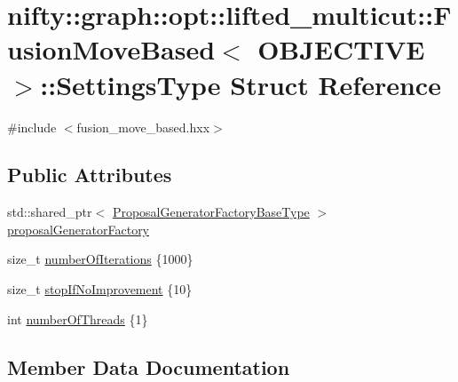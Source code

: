 \hypertarget{structnifty_1_1graph_1_1opt_1_1lifted__multicut_1_1FusionMoveBased_1_1SettingsType}{}\section{nifty\+:\+:graph\+:\+:opt\+:\+:lifted\+\_\+multicut\+:\+:Fusion\+Move\+Based$<$ O\+B\+J\+E\+C\+T\+I\+VE $>$\+:\+:Settings\+Type Struct Reference}
\label{structnifty_1_1graph_1_1opt_1_1lifted__multicut_1_1FusionMoveBased_1_1SettingsType}


{\ttfamily \#include $<$fusion\+\_\+move\+\_\+based.\+hxx$>$}

\subsection*{Public Attributes}
\begin{DoxyCompactItemize}
\item 
std\+::shared\+\_\+ptr$<$ \hyperlink{classnifty_1_1graph_1_1opt_1_1lifted__multicut_1_1FusionMoveBased_ad32ffc33c2cf2b316bcc7231b9fba245}{Proposal\+Generator\+Factory\+Base\+Type} $>$ \hyperlink{structnifty_1_1graph_1_1opt_1_1lifted__multicut_1_1FusionMoveBased_1_1SettingsType_a38c176f14f90050494f1012f777fac56}{proposal\+Generator\+Factory}
\item 
size\+\_\+t \hyperlink{structnifty_1_1graph_1_1opt_1_1lifted__multicut_1_1FusionMoveBased_1_1SettingsType_a83b8f8373c0d5320d17ac2292f4cb01d}{number\+Of\+Iterations} \{1000\}
\item 
size\+\_\+t \hyperlink{structnifty_1_1graph_1_1opt_1_1lifted__multicut_1_1FusionMoveBased_1_1SettingsType_ae90d5be70f54fba771ebcbdf0216d2e9}{stop\+If\+No\+Improvement} \{10\}
\item 
int \hyperlink{structnifty_1_1graph_1_1opt_1_1lifted__multicut_1_1FusionMoveBased_1_1SettingsType_a8362e59436e0f9c2cf47ee3d70ebe681}{number\+Of\+Threads} \{1\}
\end{DoxyCompactItemize}


\subsection{Member Data Documentation}
\mbox{\label{structnifty_1_1graph_1_1opt_1_1lifted__multicut_1_1FusionMoveBased_1_1SettingsType_a83b8f8373c0d5320d17ac2292f4cb01d}} 
